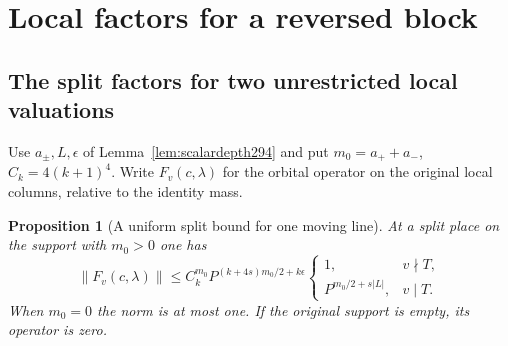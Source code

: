 \documentclass[a4paper,11pt]{article}
\newtheorem{proposition}{Proposition}[section]
\theoremstyle{definition}
\theoremstyle{remark}
\numberwithin{equation}{section}
\begin{document}
\section{Local factors for a reversed block}\label{nav:g-IX-2}

\subsection{The split factors for two unrestricted local valuations}\label{nav:II-65}
Use \(a_\pm,L,\epsilon\) of Lemma~\ref{lem:scalardepth294}
and put \(m_0=a_++a_-\), \(C_k=4(k+1)^4\). Write
\(F_v(c,\lambda)\) for the orbital operator on the
original local columns, relative to the identity mass.

\begin{proposition}[A uniform split bound for one moving line]\leavevmode
\label{prop:splitall294}
At a split place on the support with \(m_0>0\) one has
\[
 \|F_v(c,\lambda)\|\le
   C_k^{m_0} P^{(k+4s)m_0/2+k\epsilon}
   \begin{cases}
      1,&v\nmid T,\\
      P^{m_0/2+s|L|},&v\mid T .
   \end{cases}
\]
When \(m_0=0\) the norm is at most one. If the original
support is empty, its operator is zero.
\end{proposition}
\end{document}
